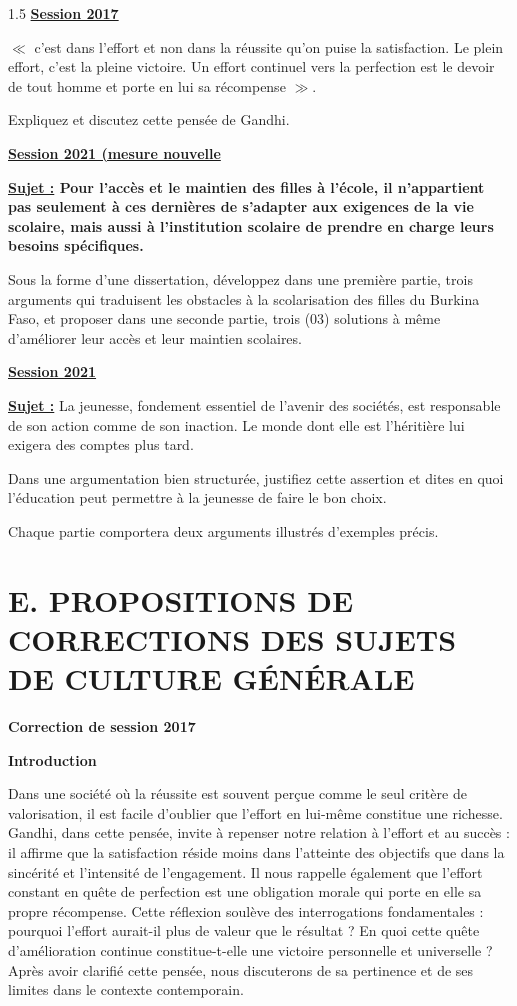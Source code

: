 \documentclass[12pt]{article}
\begin{document}
\begin{spacing}{1.5}
\quad
\textbf{\underline{Session 2017}}

$\ll$ c'est dans l'effort et non dans la réussite qu'on puise la satisfaction. Le plein effort, c'est la pleine victoire. Un effort continuel vers la perfection est le devoir de tout homme et porte en lui sa récompense $\gg$.

Expliquez et discutez cette pensée de Gandhi.


\quad
\textbf{\underline{Session 2021 (mesure nouvelle}}

\textbf{\underline{Sujet :} Pour l'accès et le maintien des filles à l'école, il n'appartient pas seulement à ces dernières de s'adapter aux exigences de la vie scolaire, mais aussi à l'institution scolaire de prendre en charge leurs besoins spécifiques.}

\quad Sous la forme d'une dissertation, développez dans une première partie, trois arguments qui traduisent les obstacles à la scolarisation des filles du Burkina Faso, et proposer dans une seconde partie, trois (03) solutions à même d'améliorer leur accès et leur maintien scolaires.


\quad
\textbf{\underline{Session 2021}}

\textbf{\underline{Sujet :}} \quad La jeunesse, fondement essentiel de l'avenir des sociétés, est responsable de son action comme de son inaction. Le monde dont elle est l'héritière lui exigera des comptes plus tard.

\quad Dans une argumentation bien structurée, justifiez cette assertion et dites en quoi l'éducation peut permettre à la jeunesse de faire le bon choix.

\quad Chaque partie comportera deux arguments illustrés d'exemples précis.


\quad
\quad




\section*{\textbf{E. PROPOSITIONS DE CORRECTIONS DES SUJETS DE CULTURE GÉNÉRALE}}

\textbf{Correction de session 2017}


\textbf{Introduction}

Dans une société où la réussite est souvent perçue comme le seul critère de valorisation, il est facile d'oublier que l'effort en lui-même constitue une richesse. Gandhi, dans cette pensée, invite à repenser notre relation à l'effort et au succès : il affirme que la satisfaction réside moins dans l'atteinte des objectifs que dans la sincérité et l'intensité de l'engagement. Il nous rappelle également que l'effort constant en quête de perfection est une obligation morale qui porte en elle sa propre récompense. Cette réflexion soulève des interrogations fondamentales : pourquoi l'effort aurait-il plus de valeur que le résultat ? En quoi cette quête d'amélioration continue constitue-t-elle une victoire personnelle et universelle ? Après avoir clarifié cette pensée, nous discuterons de sa pertinence et de ses limites dans le contexte contemporain.



\end{spacing}
\end{document}

